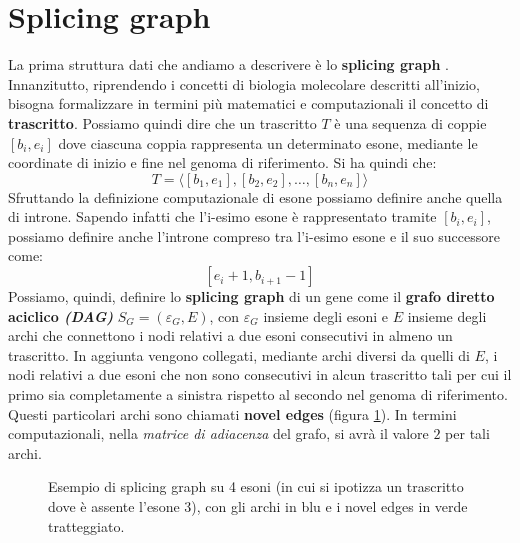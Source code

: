 \documentclass[a4paper,12pt, oneside]{book}
\begin{document}
\section{Splicing graph}
La prima struttura dati che andiamo a descrivere è lo \textbf{splicing
  graph} \cite{denti}.\\ 
Innanzitutto, riprendendo i concetti di biologia molecolare
descritti all'inizio, bisogna formalizzare in termini più matematici e
computazionali il concetto di \textbf{trascritto}. Possiamo quindi dire che un
trascritto $T$ è una sequenza di coppie $[b_i,e_i]$ dove ciascuna coppia
rappresenta un determinato esone, mediante le coordinate di inizio e fine nel
genoma di riferimento. Si ha quindi che:
\[T=\langle[b_1,e_1],[b_2,e_2],\ldots, [b_n,e_n]\rangle\]
Sfruttando la definizione computazionale di esone possiamo definire anche
quella di introne. Sapendo infatti che l'i-esimo esone è rappresentato tramite
$[b_i,e_i]$, possiamo definire anche l'introne compreso tra l'i-esimo esone e il
suo successore come:
\[[e_i+1,b_{i+1}-1]\]
Possiamo, quindi, definire lo \textbf{splicing graph} di un gene come il
\textbf{grafo diretto aciclico \textit{(DAG)}} $S_G=(\varepsilon_G, E)$, con
$\varepsilon_G$ insieme degli esoni e $E$ insieme degli archi che connettono i
nodi relativi a due
esoni consecutivi in almeno un trascritto. In aggiunta vengono collegati,
mediante archi diversi da quelli di $E$, i nodi relativi a due esoni che non
sono consecutivi in alcun trascritto tali per cui il primo sia completamente a
sinistra rispetto al secondo nel genoma di riferimento. Questi particolari archi
sono chiamati \textbf{novel edges} (figura \ref{sg}). In termini computazionali,
nella 
\textit{matrice di adiacenza} del grafo, si avrà il valore 
$2$ per tali archi. \\  
\begin{figure}[H]
  \centering
  
  \caption{Esempio di splicing graph su 4 esoni (in cui si ipotizza un trascritto
    dove è assente l'esone 3), con gli archi in blu e i novel edges in
    verde tratteggiato.} 
  \label{sg}
\end{figure}
\end{document}

